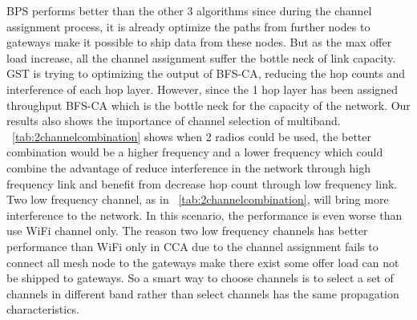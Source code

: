    BPS performs better than the other 3 algorithms since during the channel assignment process, it is already optimize the paths from further nodes to gateways make it possible to ship data from these nodes. But as the max offer load increase, all the channel assignment suffer the bottle neck of link capacity.
   GST is trying to optimizing the output of BFS-CA, reducing the hop counts and interference of each hop layer. However, since the 1 hop layer has been assigned throughput BFS-CA which is the bottle neck for the capacity of the network.
   Our results also shows the importance of channel selection of multiband. ~\ref{tab:2channelcombination} shows when 2 radios could be used, the better combination would be a higher frequency and a lower frequency which could combine the advantage of reduce interference in the network through high frequency link and benefit from decrease hop count through low frequency link. 
Two low frequency channel, as in ~\ref{tab:2channelcombination}, will bring more interference to the network.
In this scenario, the performance is even worse than use WiFi channel only. 
The reason two low frequency channels has better performance than WiFi only in CCA due to the channel assignment fails to connect all mesh node to the gateways make there exist some offer load can not be shipped to gateways.
So a smart way to choose channels is to select a set of channels in different band rather than select channels has the same propagation characteristics.



